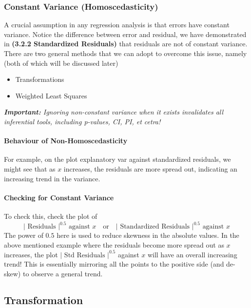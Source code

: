 \documentclass[10pt]{article}
\begin{document}
\subsubsection{Constant Variance (Homoscedasticity)}
A crucial assumption in any regression analysis is that errors have constant variance. \color{BurntOrange} Notice the difference between error and residual, we have demonstrated in \textbf{(3.2.2 Standardized Residuals)} that residuals are not of constant variance. \color{Black} There are two general methods that we can adopt to overcome this issue, namely (both of which will be discussed later)
\begin{itemize}
    \item Transformations
    \item Weighted Least Squares
\end{itemize}
\color{Red}
\textit{\textbf{Important:} Ignoring non-constant variance when it exists invalidates all inferential tools, including p-values, CI, PI, et cetra!}
\color{Black}

\paragraph{Behaviour of Non-Homoscedasticity} For example, on the plot explanatory var against standardized residuals, we might see that as $x$ increases, the residuals are more spread out, indicating an increasing trend in the variance. 

\paragraph{Checking for Constant Variance} To check this, check the plot of
\begin{equation*}
    |\text{ Residuals }|^{0.5} \text { against } x \quad \text{or} \quad |\text { Standardized Residuals }|^{0.5} \text { against } x
\end{equation*}
The power of $0.5$ here is used to reduce skewness in the absolute values. In the above mentioned example where the residuals become more spread out as $x$ increases, the plot $|\text { Std Residuals }|^{0.5}$ against $x$ will have an overall increasing trend! \color{BurntOrange} This is essentially mirroring all the points to the positive side (and de-skew) to observe a general trend. \color{Black}

\subsection{Transformation}
\end{document}
